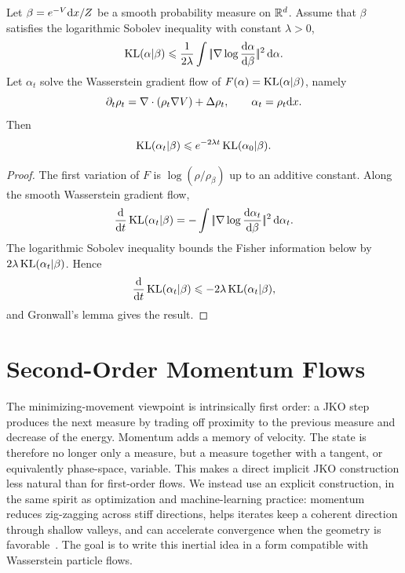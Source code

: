 \begin{prop}\label{prop-lsi-entropy-decay}
	Let $\beta=e^{-V}\mathrm{d} x/Z$ be a smooth probability measure on $\mathbb{R}^d$. Assume that $\beta$ satisfies the logarithmic Sobolev inequality with constant $\lambda>0$,
	\[
		\operatorname{KL}(\alpha|\beta)
		\leqslant
		\frac{1}{2\lambda}
		\int |\!| \nabla\log\frac{\mathrm{d}\alpha}{\mathrm{d}\beta} |\!|^2\,\mathrm{d}\alpha .
	\]
	Let $\alpha_t$ solve the Wasserstein gradient flow of $F(\alpha)=\operatorname{KL}(\alpha|\beta)$, namely
	\[
		\partial_t\rho_t
		=
		\nabla\cdot(\rho_t\nabla V)+\Delta\rho_t,
		\qquad
		\alpha_t=\rho_t\mathrm{d} x .
	\]
	Then
	\[
		\operatorname{KL}(\alpha_t|\beta)
		\leqslant
		e^{-2\lambda t}\operatorname{KL}(\alpha_0|\beta).
	\]
\end{prop}

\begin{proof}
	The first variation of $F$ is $\log(\rho/\rho_\beta)$ up to an additive constant. Along the smooth Wasserstein gradient flow,
	\[
		\frac{\mathrm{d}}{\mathrm{d} t}\operatorname{KL}(\alpha_t|\beta)
		=
		-\int |\!| \nabla\log\frac{\mathrm{d}\alpha_t}{\mathrm{d}\beta} |\!|^2\,\mathrm{d}\alpha_t.
	\]
	The logarithmic Sobolev inequality bounds the Fisher information below by $2\lambda\operatorname{KL}(\alpha_t|\beta)$. Hence
	\[
		\frac{\mathrm{d}}{\mathrm{d} t}\operatorname{KL}(\alpha_t|\beta)
		\leqslant
		-2\lambda\operatorname{KL}(\alpha_t|\beta),
	\]
	and Gronwall's lemma gives the result.
\end{proof}

\section{Second-Order Momentum Flows}
\label{sec-second-order-momentum-flows}

The minimizing-movement viewpoint is intrinsically first order: a JKO step produces the next measure by trading off proximity to the previous measure and decrease of the energy. Momentum adds a memory of velocity. The state is therefore no longer only a measure, but a measure together with a tangent, or equivalently phase-space, variable. This makes a direct implicit JKO construction less natural than for first-order flows. We instead use an explicit construction, in the same spirit as optimization and machine-learning practice: momentum reduces zig-zagging across stiff directions, helps iterates keep a coherent direction through shallow valleys, and can accelerate convergence when the geometry is favorable~\cite{Qian1999Momentum,Sutskever2013Momentum}. The goal is to write this inertial idea in a form compatible with Wasserstein particle flows.

